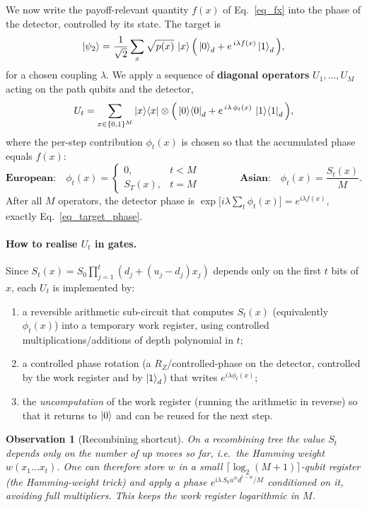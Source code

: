 \documentclass{article}
\newtheorem{remark}{Observation}
\begin{document}
We now write the payoff-relevant quantity $f(x)$ of Eq.~\eqref{eq_fx} into the phase of the detector, controlled by its state. The target is
\begin{equation}\label{eq_target_phase}
\ket{\psi_2} = \frac{1}{\sqrt2}\sum_{x}\sqrt{p(x)}\,\ket{x}\Big(\ket{0}_d + e^{\,i\lambda f(x)}\ket{1}_d\Big),
\end{equation}
for a chosen coupling $\lambda$. We apply a sequence of \textbf{diagonal operators} $U_1,\dots,U_M$ acting on the path qubits and the detector,
\begin{equation}\label{eq_Ut}
U_t = \sum_{x\in\{0,1\}^M}\ket{x}\!\bra{x}\otimes\Big(\ket{0}\!\bra{0}_d + e^{\,i\lambda\,\phi_t(x)}\,\ket{1}\!\bra{1}_d\Big),
\end{equation}
where the per-step contribution $\phi_t(x)$ is chosen so that the accumulated phase equals $f(x)$:
\begin{equation}\label{eq_phit}
\textbf{European:}\quad \phi_t(x) = \begin{cases}0,& t<M\\ S_T(x),& t=M\end{cases}
\qquad\qquad
\textbf{Asian:}\quad \phi_t(x) = \frac{S_t(x)}{M}.
\end{equation}
After all $M$ operators, the detector phase is $\exp\!\big[i\lambda\sum_t\phi_t(x)\big]=e^{i\lambda f(x)}$, exactly Eq.~\eqref{eq_target_phase}.

\paragraph{How to realise $U_t$ in gates.}
Since $S_t(x)=S_0\prod_{j=1}^{t}(d_j+(u_j-d_j)x_j)$ depends only on the first $t$ bits of $x$, each $U_t$ is implemented by:
\begin{enumerate}
    \item a reversible arithmetic sub-circuit that computes $S_t(x)$ (equivalently $\phi_t(x)$) into a temporary work register, using controlled multiplications/additions of depth polynomial in $t$;
    \item a controlled phase rotation (a $R_Z$/controlled-phase on the detector, controlled by the work register and by $\ket{1}_d$) that writes $e^{i\lambda\phi_t(x)}$;
    \item the \emph{uncomputation} of the work register (running the arithmetic in reverse) so that it returns to $\ket{0}$ and can be reused for the next step.
\end{enumerate}

\begin{remark}[Recombining shortcut]
On a recombining tree the value $S_t$ depends only on the number of up moves so far, i.e.\ the Hamming weight $w(x_1\dots x_t)$. One can therefore store $w$ in a small $\lceil\log_2(M{+}1)\rceil$-qubit register (the Hamming-weight trick) and apply a phase $e^{i\lambda\,S_0 u^{w}d^{t-w}/M}$ conditioned on it, avoiding full multipliers. This keeps the work register logarithmic in $M$.
\end{remark}
\end{document}
